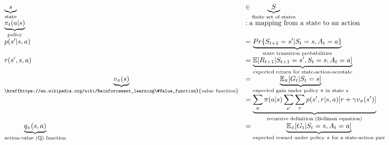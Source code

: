 \documentclass[10pt,landscape]{article}
\begin{document}
\begin{multicols}{3}
\begin{equation}
    \begin{array}{l l}
        \underbrace{s}_\text{state} &\in \underbrace{S}_\text{finite set of states}\\
        \underbrace{\pi_t(a|s)}_\text{policy} &: \text{a mapping from a state to an action}\\
        p(s'|s,a) &= \underbrace{Pr \{S_{t + 1} = s' | S_t=s,A_t=a\}}_\text{state transition probabilities}\\
        r(s',s, a) &= \underbrace{\mathbb{E}[ R_{t + 1} | S_{t + 1}=s',S_t=s,A_t=a]}_\text{expected return for state-action-nexstate}\\
        \underbrace{v_{\pi}(s)}_\text{\href{https://en.wikipedia.org/wiki/Reinforcement_learning\#Value_function}{value function}} &= \underbrace{\mathbb{E}_{\pi}[G_t | S_t = s]}_\text{expected gain under policy $\pi$ in state $s$}\\
        &= \underbrace{\sum\limits_{a} \pi(a | s) \sum\limits_{s'}\sum\limits_{r} p(s', r | s, a)[r + \gamma v_{\pi}(s')]}_\text{recursive definition (Bellman equation)}\\
        \underbrace{q_{\pi}(s,a)}_\text{action-value (Q) function} &= \underbrace{\mathbb{E}_{\pi}[G_t | S_t = s, A_t = a]}_\text{expected reward under policy $\pi$ for a state-action pair}\\

\end{array}
\end{equation}
\end{multicols}
\end{document}
